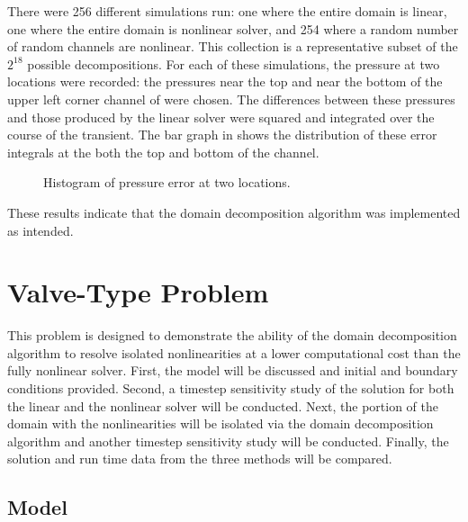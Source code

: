 There were 256 different simulations run: one where the entire domain is linear, one where the entire domain is nonlinear solver, and 254 where a random number of random channels are nonlinear.
This collection is a representative subset of the $2^{18}$ possible decompositions.
For each of these simulations, the pressure at two locations were recorded: the pressures near the top and near the bottom of the upper left corner channel of  were chosen.
The differences between these pressures and those produced by the linear solver were squared and integrated over the course of the transient.
The bar graph in  shows the distribution of these error integrals at the both the top and bottom of the channel.

\begin{figure}[h!t]
\centering

\caption{Histogram of pressure error at two locations.}
\label{fig:complexBar}
\end{figure}

These results indicate that the domain decomposition algorithm was implemented as intended.

\section{Valve-Type Problem}
\label{sect:valveProblem}

This problem is designed to demonstrate the ability of the domain decomposition algorithm to resolve isolated nonlinearities at a lower computational cost than the fully nonlinear solver. 
First, the model will be discussed and initial and boundary conditions provided.
Second, a timestep sensitivity study of the solution for both the linear and the nonlinear solver will be conducted.
Next, the portion of the domain with the nonlinearities will be isolated via the domain decomposition algorithm and another timestep sensitivity study will be conducted.
Finally, the solution and run time data from the three methods will be compared.

\subsection{Model}
\label{subsect:valveModel}

